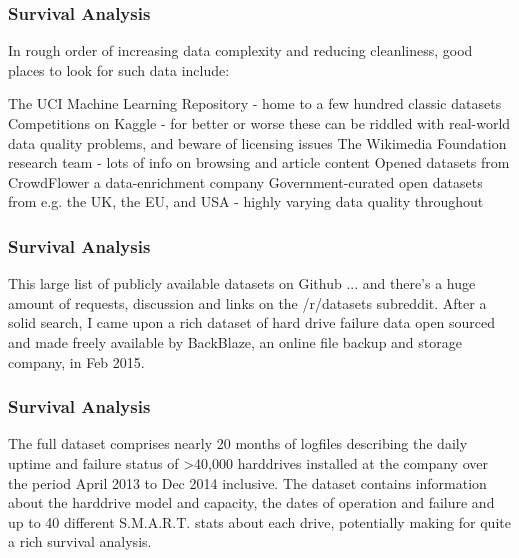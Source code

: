 	\begin{frame}
		\frametitle{Survival Analysis}
		In rough order of increasing data complexity and reducing cleanliness, good places to look for such data include:
		
		The UCI Machine Learning Repository - home to a few hundred classic datasets
		Competitions on Kaggle - for better or worse these can be riddled with real-world data quality problems, and beware of licensing issues
		The Wikimedia Foundation research team - lots of info on browsing and article content
		Opened datasets from CrowdFlower a data-enrichment company
		Government-curated open datasets from e.g. the UK, the EU, and USA - highly varying data quality throughout
	\end{frame}
	\begin{frame}
		\frametitle{Survival Analysis}
		This large list of publicly available datasets on Github
		... and there's a huge amount of requests, discussion and links on the /r/datasets subreddit.
		After a solid search, I came upon a rich dataset of hard drive failure data open sourced and made freely available by BackBlaze, an online file backup and storage company, in Feb 2015.
		
	\end{frame}
	\begin{frame}
		\frametitle{Survival Analysis}
		The full dataset comprises nearly 20 months of logfiles describing the daily uptime and failure status of >40,000 harddrives installed at the company over the period April 2013 to Dec 2014 inclusive. The dataset contains information about the harddrive model and capacity, the dates of operation and failure and up to 40 different S.M.A.R.T. stats about each drive, potentially making for quite a rich survival analysis.
	\end{frame}
